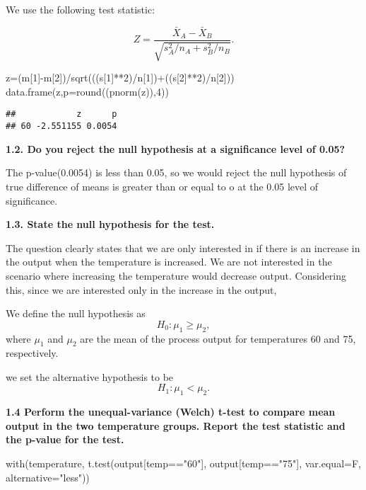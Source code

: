 \documentclass[
]{article}
\newenvironment{Shaded}{\begin{snugshade}}{\end{snugshade}}
\newcommand{\AttributeTok}[1]{\textcolor[rgb]{0.77,0.63,0.00}{#1}}
\newcommand{\DecValTok}[1]{\textcolor[rgb]{0.00,0.00,0.81}{#1}}
\newcommand{\FunctionTok}[1]{\textcolor[rgb]{0.00,0.00,0.00}{#1}}
\newcommand{\NormalTok}[1]{#1}
\newcommand{\OtherTok}[1]{\textcolor[rgb]{0.56,0.35,0.01}{#1}}
\newcommand{\SpecialCharTok}[1]{\textcolor[rgb]{0.00,0.00,0.00}{#1}}
\newcommand{\StringTok}[1]{\textcolor[rgb]{0.31,0.60,0.02}{#1}}
\begin{document}
We use the following test statistic:

\[
Z = \frac{\bar X_A - \bar X_B}{\sqrt{s^2_A/n_A+s^2_B/n_B}}.
\]

\begin{Shaded}
\begin{Highlighting}[]
\NormalTok{z}\OtherTok{=}\NormalTok{(m[}\DecValTok{1}\NormalTok{]}\SpecialCharTok{{-}}\NormalTok{m[}\DecValTok{2}\NormalTok{])}\SpecialCharTok{/}\FunctionTok{sqrt}\NormalTok{(((s[}\DecValTok{1}\NormalTok{]}\SpecialCharTok{**}\DecValTok{2}\NormalTok{)}\SpecialCharTok{/}\NormalTok{n[}\DecValTok{1}\NormalTok{])}\SpecialCharTok{+}\NormalTok{((s[}\DecValTok{2}\NormalTok{]}\SpecialCharTok{**}\DecValTok{2}\NormalTok{)}\SpecialCharTok{/}\NormalTok{n[}\DecValTok{2}\NormalTok{]))}
\FunctionTok{data.frame}\NormalTok{(z,}\AttributeTok{p=}\FunctionTok{round}\NormalTok{((}\FunctionTok{pnorm}\NormalTok{(z)),}\DecValTok{4}\NormalTok{))}
\end{Highlighting}
\end{Shaded}

\begin{verbatim}
##            z      p
## 60 -2.551155 0.0054
\end{verbatim}

\textbf{1.2. Do you reject the null hypothesis at a significance level
of 0.05?}

The p-value(0.0054) is less than 0.05, so we would reject the null
hypothesis of true difference of means is greater than or equal to o at
the 0.05 level of significance.

\textbf{1.3. State the null hypothesis for the test.}

The question clearly states that we are only interested in if there is
an increase in the output when the temperature is increased. We are not
interested in the scenario where increasing the temperature would
decrease output. Considering this, since we are interested only in the
increase in the output,

We define the null hypothesis as \[H_0:\mu_1\ge\mu_2,\] where \(\mu_1\)
and \(\mu_2\) are the mean of the process output for temperatures 60 and
75, respectively.

we set the alternative hypothesis to be \[H_1:\mu_1<\mu_2.\]

\textbf{1.4 Perform the unequal-variance (Welch) t-test to compare mean
output in the two temperature groups. Report the test statistic and the
p-value for the test.}

\begin{Shaded}
\begin{Highlighting}[]
\FunctionTok{with}\NormalTok{(temperature, }\FunctionTok{t.test}\NormalTok{(output[temp}\SpecialCharTok{==}\StringTok{"60"}\NormalTok{], output[temp}\SpecialCharTok{==}\StringTok{"75"}\NormalTok{], }\AttributeTok{var.equal=}\NormalTok{F, }\AttributeTok{alternative=}\StringTok{"less"}\NormalTok{))}
\end{Highlighting}
\end{Shaded}
\end{document}
